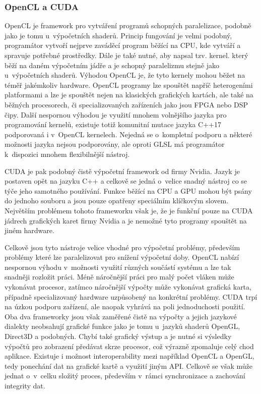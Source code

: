 \subsubsection{OpenCL a CUDA}
OpenCL je framework pro vytváření programů schopných paralelizace, podobně jako je tomu u~výpočetních shaderů. Princip fungování je velmi podobný, programátor vytvoří nejprve zaváděcí program běžící na CPU, kde vytváří a spravuje potřebné prostředky. Dále je také nutné, aby napsal tzv. kernel. který běží na daném výpočetním jádře a je schopný paralelizmu stejně jako u~výpočetních shaderů. Výhodou OpenCL je, že tyto kernely mohou běžet na téměř jakémkoliv hardware. OpenCL programy lze spouštět napříč heterogeními platformami a lze je spouštět nejen na klasických grafických kartách, ale také na běžných procesorech, či specializovaných zařízeních jako jsou FPGA nebo DSP čipy. Další nespornou výhodou je využití mnohem volnějšího jazyka pro programování kernelů, existuje totiž komunitní mutace jazyka C++17 podporovaná i v~OpenCL kernelech. Nejedná se o~kompletní podporu a některé možnosti jazyka nejsou podporovány, ale oproti GLSL má programátor k~dispozici mnohem flexibilnější nástroj. \cite{opencl}

CUDA je pak podobný čistě výpočetní framework od firmy Nvidia. Jazyk je postaven opět na jazyku C++ a celkově se jedná o~velice snadný nástroj co se týče jeho samotného používání. Funkce běžící na CPU a GPU mohou být psány do jednoho souboru a jsou pouze opatřeny speciálním klíčkovým slovem. Největším problémem tohoto frameworku však je, že je funkční pouze na CUDA jádrech grafických karet firmy Nvidia a je nemožné tyto programy spouštět na jiném hardware. \cite{nvidia_developer_2021} \cite{10_ebersole_2018}

Celkově jsou tyto nástroje velice vhodné pro výpočetní problémy, především problémy které lze paralelizovat pro snížení výpočetní doby. OpenCL nabízí nespornou výhodu v~možnosti využití různých součástí systému a lze tak snadněji rozložit práci. Méně náročnější práci pro malý počet vláken může vykonávat procesor, zatímco náročnější výpočty může vykonávat grafická karta, případně specializovaný hardware uzpůsobený na konkrétní problémy. CUDA trpí na úzkou podporu zařízení, ale naopak vyhrává na poli jednoduchosti použití. Oba dva frameworky jsou však zaměřené čistě na výpočty a jejich jazykové dialekty neobsahují grafické funkce jako je tomu u~jazyků shaderů OpenGL, Direct3D a podobných. Chybí také grafický výstup a je nutné si výsledky výpočtů pro zobrazení předávat skrze procesor, což výrazně zpomaluje celý chod aplikace. Existuje i možnost interoperability mezi například OpenCL a OpenGL, tedy ponechání dat na grafické kartě a využití jiným API. Celkově se však může jednat o~v~celku složitý proces, především v~rámci synchronizace a zachování integrity dat.

